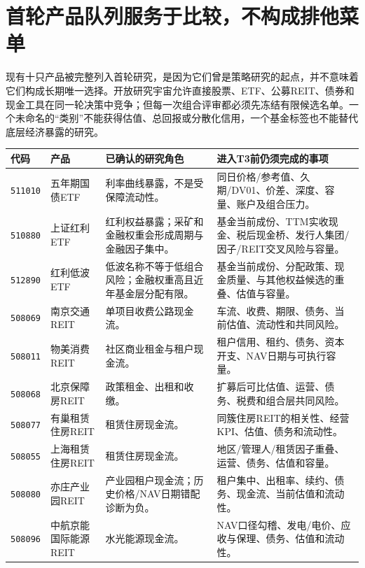 \section{首轮产品队列服务于比较，不构成排他菜单}

现有十只产品被完整列入首轮研究，是因为它们曾是策略研究的起点，并不意味着它们构成长期唯一选择。开放研究宇宙允许直接股票、ETF、公募REIT、债券和现金工具在同一轮决策中竞争；但每一次组合评审都必须先冻结有限候选名单。一个未命名的“类别”不能获得估值、总回报或分散化信用，一个基金标签也不能替代底层经济暴露的研究。

\begin{exhibitbox}[首轮已尽调产品队列：用于后续跨资产比较，当前均为$q=0$]
\footnotesize
\begin{tabularx}{\exhibitboxwidth}{L{1.35cm}L{2.45cm}L{2.3cm}P}
\toprule
\textbf{代码} & \textbf{产品} & \textbf{已确认的研究角色} & \textbf{进入T3前仍须完成的事项} \\
\midrule
\texttt{511010} & 五年期国债ETF & 利率曲线暴露，不是受保障流动性。 & 同日价格/参考值、久期/DV01、价差、深度、容量、账户及组合压力。 \\
\texttt{510880} & 上证红利ETF & 红利权益暴露；采矿和金融权重会形成周期与金融因子集中。 & 基金当前成份、TTM实收现金、税后现金桥、发行人集团/因子/REIT交叉风险与容量。 \\
\texttt{512890} & 红利低波ETF & 低波名称不等于低组合风险；金融权重高且近年基金层分配有限。 & 基金当前成份、分配政策、现金质量、与其他权益候选的重叠、估值与容量。 \\
\texttt{508069} & 南京交通REIT & 单项目收费公路现金流。 & 车流、收费、期限、债务、当前估值、流动性和共同风险。 \\
\texttt{508011} & 物美消费REIT & 社区商业租金与租户现金流。 & 租户信用、租约、债务、资本开支、NAV日期与可执行容量。 \\
\texttt{508068} & 北京保障房REIT & 政策租金、出租和收缴。 & 扩募后可比估值、运营、债务、税费和组合层共同风险。 \\
\texttt{508077} & 有巢租赁住房REIT & 租赁住房现金流。 & 同簇住房REIT的相关性、经营KPI、估值、债务和流动性。 \\
\texttt{508055} & 上海租赁住房REIT & 租赁住房现金流。 & 地区/管理人/租赁因子重叠、运营、债务、估值和容量。 \\
\texttt{508080} & 亦庄产业园REIT & 产业园租户现金流；历史价格/NAV日期错配诊断为负。 & 租户集中、出租率、续约、债务、现金流、当前估值和流动性。 \\
\texttt{508096} & 中航京能国际能源REIT & 水光能源现金流。 & NAV口径勾稽、发电/电价、应收与保理、债务、估值和流动性。 \\
\bottomrule
\end{tabularx}
\end{exhibitbox}

